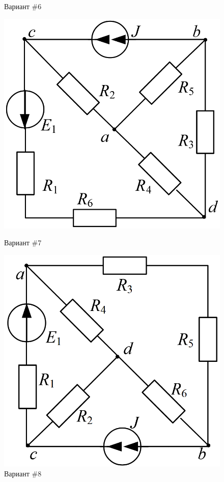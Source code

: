\begin{figure}[H]
\begin{minipage}{0.48\textwidth}
        \caption{Вариант \#6}
        \label{fig:task_6}
    \end{minipage}
\end{figure}

\begin{figure}[H]
    \centering
    \begin{minipage}{0.48\textwidth}
        \centering
        \includegraphics[width=\textwidth]{images/7_task.png}
        \caption{Вариант \#7}
        \label{fig:task_7}
    \end{minipage}
    \hfill
    \begin{minipage}{0.48\textwidth}
        \centering
        \includegraphics[width=\textwidth]{images/8_task.png}
        \caption{Вариант \#8}
        \label{fig:task_8}
    \end{minipage}
\end{figure}


